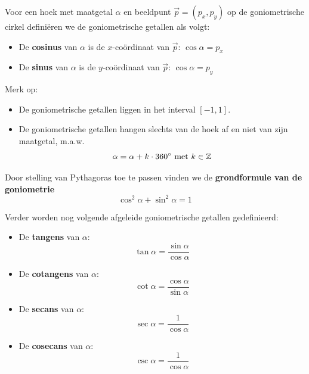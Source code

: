 \documentclass[a4paper,12pt]{article}
\begin{document}
Voor een hoek met maatgetal $\alpha$ en beeldpunt $\vec{p}=(p_x,p_y)$ op de goniometrische cirkel definiëren we de goniometrische getallen als volgt:

\begin{itemize}
  \item De {\bf cosinus} van $\alpha$ is de $x$-coördinaat van $\vec{p}$: $\cos\alpha=p_x$
  \item De {\bf sinus} van $\alpha$ is de $y$-coördinaat van $\vec{p}$: $\cos\alpha=p_y$
\end{itemize}

Merk op:
\begin{itemize}
  \item De goniometrische getallen liggen in het interval $[-1,1]$.
  \item De goniometrische getallen hangen slechts van de hoek af en niet van zijn maatgetal, m.a.w.
  $$\alpha = \alpha + k\cdot 360^\circ\mbox{ met }k\in\mathbb{Z}$$
\end{itemize}

Door stelling van Pythagoras toe te passen vinden we de {\bf grondformule van de goniometrie}
$$\cos^2\alpha + \sin^2\alpha = 1$$

Verder worden nog volgende afgeleide goniometrische getallen gedefinieerd:
\begin{itemize}
  \item De {\bf tangens} van $\alpha$:
  $$\tan\alpha=\dfrac{\sin\alpha}{\cos\alpha}$$
  \item De {\bf cotangens} van $\alpha$:
  $$\cot\alpha=\dfrac{\cos\alpha}{\sin\alpha}$$
  \item De {\bf secans} van $\alpha$:
  $$\sec\alpha=\dfrac{1}{\cos\alpha}$$
  \item De {\bf cosecans} van $\alpha$:
  $$\csc\alpha=\dfrac{1}{\cos\alpha}$$
\end{itemize}

\pagebreak
\end{document}
